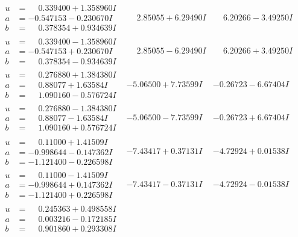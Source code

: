 \documentclass[1p]{elsarticle_modified}
\theoremstyle{definition}
\begin{document}
$$\begin{array}{c|c|c}
\begin{aligned}
u &= \phantom{-}0.339400 + 1.358960 I \\
a &= -0.547153 - 0.230670 I \\
b &= \phantom{-}0.378354 + 0.934639 I\end{aligned}
 & \phantom{-}2.85055 + 6.29490 I & \phantom{-}6.20266 - 3.49250 I \\ \hline\begin{aligned}
u &= \phantom{-}0.339400 - 1.358960 I \\
a &= -0.547153 + 0.230670 I \\
b &= \phantom{-}0.378354 - 0.934639 I\end{aligned}
 & \phantom{-}2.85055 - 6.29490 I & \phantom{-}6.20266 + 3.49250 I \\ \hline\begin{aligned}
u &= \phantom{-}0.276880 + 1.384380 I \\
a &= \phantom{-}0.88077 + 1.63584 I \\
b &= \phantom{-}1.090160 - 0.576724 I\end{aligned}
 & -5.06500 + 7.73599 I & -0.26723 - 6.67404 I \\ \hline\begin{aligned}
u &= \phantom{-}0.276880 - 1.384380 I \\
a &= \phantom{-}0.88077 - 1.63584 I \\
b &= \phantom{-}1.090160 + 0.576724 I\end{aligned}
 & -5.06500 - 7.73599 I & -0.26723 + 6.67404 I \\ \hline\begin{aligned}
u &= \phantom{-}0.11000 + 1.41509 I \\
a &= -0.998644 - 0.147362 I \\
b &= -1.121400 - 0.226598 I\end{aligned}
 & -7.43417 + 0.37131 I & -4.72924 + 0.01538 I \\ \hline\begin{aligned}
u &= \phantom{-}0.11000 - 1.41509 I \\
a &= -0.998644 + 0.147362 I \\
b &= -1.121400 + 0.226598 I\end{aligned}
 & -7.43417 - 0.37131 I & -4.72924 - 0.01538 I \\ \hline\begin{aligned}
u &= \phantom{-}0.245363 + 0.498558 I \\
a &= \phantom{-}0.003216 - 0.172185 I \\
b &= \phantom{-}0.901860 + 0.293308 I\end{aligned}

\end{array}$$
\end{document}
